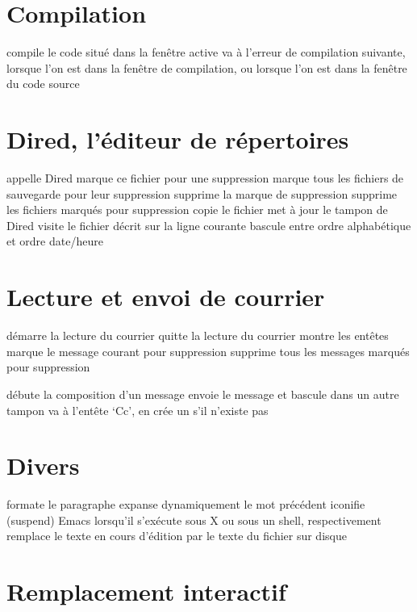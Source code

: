 \section{Compilation}

 compile le code situ\'e dans la fen\^etre active
 va \`a l'erreur de compilation suivante, lorsque l'on est
dans la fen\^etre de compilation, ou
 lorsque l'on est dans la fen\^etre du code source

\section{Dired, l'\'editeur de r\'epertoires}

  appelle Dired
 marque ce fichier pour une suppression
\key{\~{}} marque tous les fichiers de sauvegarde pour leur suppression
 supprime la marque de suppression
 supprime les fichiers marqu\'es pour suppression
 copie le fichier
 met \`a jour le tampon de Dired
 visite le fichier d\'ecrit sur la ligne courante
 bascule entre ordre alphab\'etique et ordre date/heure

\section{Lecture et envoi de courrier}

 d\'emarre la lecture du courrier
 quitte la lecture du courrier
 montre les ent\^etes
 marque le message courant pour suppression
 supprime tous les messages marqu\'es pour suppression

 d\'ebute la composition d'un message
 envoie le message et bascule dans un autre tampon
 va \`a l'ent\^ete `Cc', en cr\'ee un s'il n'existe pas

\section{Divers}

 formate le paragraphe
 expanse dynamiquement le mot pr\'ec\'edent
 iconifie (suspend) Emacs lorsqu'il s'ex\'ecute sous X ou
  sous un shell, respectivement
 remplace le texte en cours d'\'edition par le
texte du fichier sur disque

\section{Remplacement interactif}

